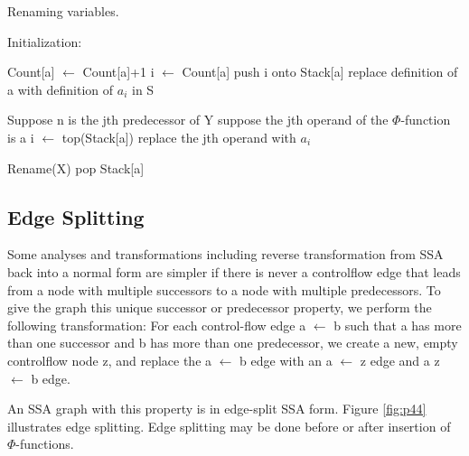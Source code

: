 \begin{algorithm}
\caption{Renaming variables.}\label{alg:Renaming variables}
\begin{algorithmic}
\State Initialization:

\EndFor

\EndFor
\EndIf
{}

\State Count[a] $\gets$ Count[a]+1
\State i $\gets$ Count[a]
\State push i onto Stack[a]
\State replace definition of a with definition of $a_i$ in S
\EndFor
\EndFor

\State Suppose n is the jth predecessor of Y
\State suppose the jth operand of the $\Phi$-function is a
\State i $\gets$ top(Stack[a])
\State replace the jth operand with $a_i$

\EndFor
\EndFor
{}
\State Rename(X)
\EndFor
{}
\State pop Stack[a]
\EndFor
\end{algorithmic}
\end{algorithm}




\subsection{Edge Splitting}

Some analyses and transformations including reverse transformation from SSA back into a normal form are simpler if there is never a controlflow edge that leads from a node with multiple successors to a node with multiple predecessors. To give the graph this unique successor or predecessor property, we perform the following transformation: For each control-flow edge a $\gets$ b such that a has more than one successor and b has more than one predecessor, we create a new, empty controlflow node z, and replace the a $\gets$ b edge with an a $\gets$ z edge and a z $\gets$ b edge.

An SSA graph with this property is in edge-split SSA form. Figure \ref{fig:p44} illustrates edge splitting. Edge splitting may be done before or after insertion of $\Phi$-functions.
